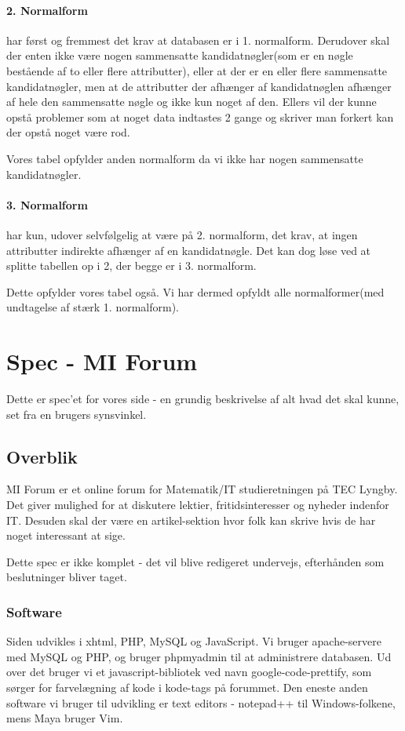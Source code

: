 \documentclass{article}
\begin{document}
\paragraph{2. Normalform}
har først og fremmest det krav at databasen er i 1. normalform. Derudover skal der enten ikke være nogen sammensatte kandidatnøgler(som er en nøgle bestående af to eller flere attributter), eller at der er en eller flere sammensatte kandidatnøgler, men at de attributter der afhænger af kandidatnøglen afhænger af hele den sammensatte nøgle og ikke kun noget af den. Ellers vil der kunne opstå problemer som at noget data indtastes 2 gange og skriver man forkert kan der opstå noget være rod.

Vores tabel opfylder anden normalform da vi ikke har nogen sammensatte kandidatnøgler.

\paragraph{3. Normalform}
har kun, udover selvfølgelig at være på 2. normalform, det krav, at ingen attributter indirekte afhænger af en kandidatnøgle. Det kan dog løse ved at splitte tabellen op i 2, der begge er i 3. normalform.

Dette opfylder vores tabel også. Vi har dermed opfyldt alle normalformer(med undtagelse af stærk 1. normalform).

\section{Spec - MI Forum}

Dette er spec'et for vores side - en grundig beskrivelse af alt hvad det skal kunne, set fra en brugers synsvinkel.

\subsection{Overblik}

MI Forum er et online forum for Matematik/IT studieretningen på TEC Lyngby. Det giver mulighed for at diskutere lektier, fritidsinteresser og nyheder indenfor IT. Desuden skal der være en artikel-sektion hvor folk kan skrive hvis de har noget interessant at sige.

Dette spec er ikke komplet - det vil blive redigeret undervejs, efterhånden som beslutninger bliver taget.

\subsubsection{Software}
Siden udvikles i xhtml, PHP, MySQL og JavaScript. Vi bruger apache-servere med MySQL og PHP, og bruger phpmyadmin til at administrere databasen. Ud over det bruger vi et javascript-bibliotek ved navn google-code-prettify, som sørger for farvelægning af kode i kode-tags på forummet. Den eneste anden software vi bruger til udvikling er text editors - notepad++ til Windows-folkene, mens Maya bruger Vim.
\end{document}
